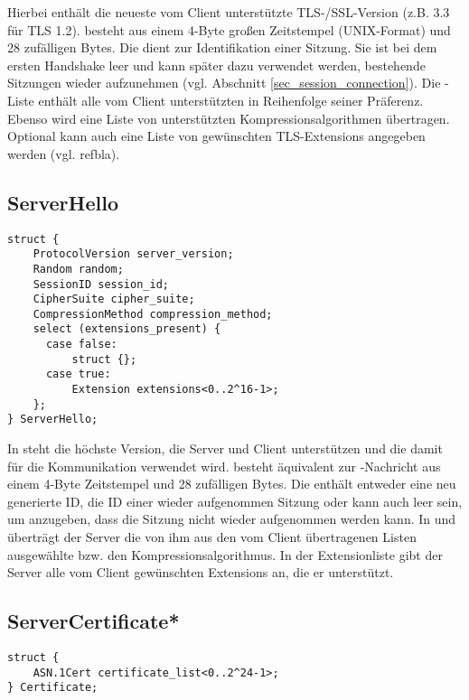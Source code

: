Hierbei enthält  die neueste vom Client unterstützte TLS-/SSL-Version (z.B. 3.3 für TLS 1.2). 
 besteht aus einem 4-Byte großen Zeitstempel (UNIX-Format) und 28 zufälligen Bytes. 
Die  dient zur Identifikation einer Sitzung. Sie ist bei dem ersten Handshake leer und kann später dazu verwendet werden, bestehende Sitzungen wieder aufzunehmen (vgl. Abschnitt \ref{sec_session_connection}). 
Die \ciphersuite{}-Liste enthält alle vom Client unterstützten \ciphersuites{} in Reihenfolge seiner Präferenz. 
Ebenso wird eine Liste von unterstützten Kompressionsalgorithmen übertragen. 
Optional kann auch eine Liste von gewünschten TLS-Extensions angegeben werden (vgl. refbla).

\subsection*{ServerHello}

\begin{lstlisting}
struct {
	ProtocolVersion server_version;
	Random random;
	SessionID session_id;
	CipherSuite cipher_suite;
	CompressionMethod compression_method;
	select (extensions_present) {
	  case false:
	      struct {};
	  case true:
	      Extension extensions<0..2^16-1>;
	};
} ServerHello;
\end{lstlisting}

In  steht die höchste Version, die Server und Client unterstützen und die damit für die Kommunikation verwendet wird.  besteht äquivalent zur \clienthello{}-Nachricht aus einem 4-Byte Zeitstempel und 28 zufälligen Bytes. Die  enthält entweder eine neu generierte ID, die ID einer wieder aufgenommen Sitzung oder kann auch leer sein, um anzugeben, dass die Sitzung nicht wieder aufgenommen werden kann. In  und  überträgt der Server die von ihm aus den vom Client übertragenen Listen ausgewählte \ciphersuite{} bzw. den Kompressionsalgorithmus. In der Extensionliste gibt der Server alle vom Client gewünschten Extensions an, die er unterstützt.

\subsection*{ServerCertificate*}

\begin{lstlisting}
struct {
	ASN.1Cert certificate_list<0..2^24-1>;
} Certificate;
\end{lstlisting}

